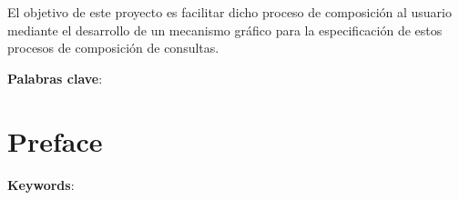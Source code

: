 \documentclass[a4paper,12pt]{book}
\begin{document}
	
	El objetivo de este proyecto es facilitar dicho proceso de composición al usuario mediante el desarrollo de un mecanismo gráfico para la especificación de estos procesos de composición de consultas.
	

	
	\textbf{Palabras clave}: 
	\cleardoublepage
	
	\clearpage
	
	\chapter*{Preface}

	

	\textbf{Keywords}:
	\cleardoublepage
	
	\setcounter{page}{1}
	
	\clearpage
	
	
	
	\clearpage
	
	
	
	\clearpage
	
	
	
	\clearpage
	
	
	
	\clearpage
	
		
	
	\clearpage

	


	
	
	
	
\end{document}
